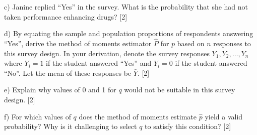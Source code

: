 \documentclass[a4paper, 11pt]{article}
\begin{document}
c) Janine replied ``Yes'' in the survey. What is the probability that she had not taken performance enhancing drugs? [2]

%

d) By equating the sample and population proportions of respondents answering ``Yes'', derive the method of moments estimator $\hat P$ for $p$ based on $n$ responses to this survey design. In your derivation, denote the survey responses $Y_1, Y_2, \ldots, Y_n$ where $Y_i = 1$ if the student answered ``Yes'' and $Y_i = 0$ if the student answered ``No''. Let the mean of these responses be $\bar Y$. [2]

%
%
%
%

e) Explain why values of  0 and 1 for $q$ would not be suitable in this survey design. [2]

%

f)  For which values of $q$ does the method of moments estimate $\hat p$ yield a valid probability? Why is it challenging to select $q$ to satisfy this condition? [2] 
\end{document}
